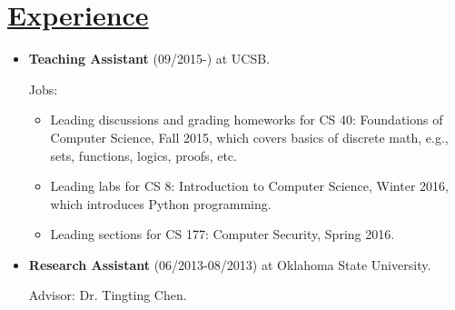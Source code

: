 \documentclass{article}
\newlength{\nL}
\newcommand{\underLineText}[1]{\settowidth{\nL}{#1}\setlength{\nL}{0.8\textwidth-\nL}\underline{{\sc #1}\hspace{\nL}}}
\begin{document}
\section*{\underLineText{Experience}}
\begin{itemize}
\item {\bf Teaching Assistant} (09/2015-) at UCSB.

Jobs: 
	\begin{itemize}
	\item Leading discussions and grading homeworks for CS 40: Foundations of Computer Science, Fall 2015, which covers basics of discrete math, e.g., sets, functions, logics, proofs, etc.
	\item Leading labs for CS 8: Introduction to Computer Science, Winter 2016, which introduces Python programming.
	\item Leading sections for CS 177: Computer Security, Spring 2016.
	\end{itemize}
\item {\bf Research Assistant} (06/2013-08/2013) at Oklahoma State University.

Advisor: Dr. Tingting Chen.


\end{itemize}
\end{document}
